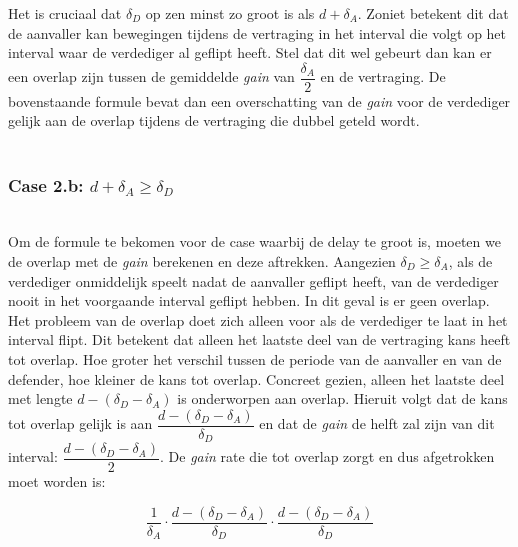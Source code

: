 \documentclass[master=cws, masteroption=vs,english]{kulemt}
\begin{document}
\begin{abstract*}
Het is cruciaal dat $ \delta_{D}$ op zen minst zo groot is als $d + \delta_{A}$. Zoniet betekent dit dat de aanvaller kan bewegingen tijdens de vertraging in het interval die volgt op het interval waar de verdediger al geflipt heeft. Stel dat dit wel gebeurt dan kan er een overlap zijn tussen de gemiddelde \textit{gain} van $\dfrac{\delta_{A}}{2}$ en de vertraging. De bovenstaande formule bevat dan een overschatting van de \textit{gain} voor de verdediger gelijk aan de overlap tijdens de vertraging die dubbel geteld wordt. \\


~~ \\
\subsubsection*{\textbf{Case 2.b:} $d + \delta_{A} \geq \delta_{D}$}
~~~\\

Om de formule te bekomen voor de case waarbij de delay te groot is, moeten we de overlap met de \textit{gain} berekenen en deze aftrekken. 
Aangezien $\delta_{D} \geq \delta_{A}$, als de verdediger onmiddelijk speelt nadat de aanvaller geflipt heeft, van de verdediger nooit in het voorgaande interval geflipt hebben. In dit geval is er geen overlap. Het probleem van de overlap doet zich alleen voor als de verdediger te laat in het interval flipt. Dit betekent dat alleen het laatste deel van de vertraging kans heeft tot overlap. Hoe groter het verschil tussen de periode van de aanvaller en van de defender, hoe kleiner de kans tot overlap. Concreet gezien, alleen het laatste deel met lengte $d - (\delta_{D} - \delta_{A})$ is onderworpen aan overlap. Hieruit volgt dat de kans tot overlap gelijk is aan $\dfrac{ d - (\delta_{D} - \delta_{A})}{\delta_{D}}$ en dat de \textit{gain} de helft zal zijn van dit interval: $\dfrac{ d - (\delta_{D} - \delta_{A})}{2}$.  De \textit{gain} rate die tot overlap zorgt en dus afgetrokken moet worden is:

\begin{equation}\label{first}
\dfrac{1} {\delta_{A}} \cdot \dfrac{d - (\delta_{D} - \delta_{A})}{\delta_{D}} \cdot \dfrac{d - (\delta_{D} - \delta_{A})}{\delta_{D}}
\end{equation}


\end{abstract*}
\end{document}
